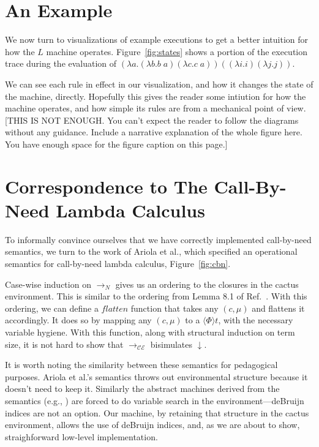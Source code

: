 \documentclass[preprint]{sigplanconf}
\begin{document}
\section{An Example}

We now turn to 
visualizations of example executions to get a better intuition for how the $L$
machine operates. Figure~\ref{fig:states} shows a portion
of the execution trace during the evaluation of $(\lambda a.(\lambda b.b \; a)
(\lambda c.c \; a)) ((\lambda i.i) (\lambda j.j))$. 



We can see each rule in effect in our visualization, and how it changes the
state of the machine, directly. Hopefully this gives the reader some intiution
for how the machine operates, and how simple its rules are from a mechanical
point of view. [THIS IS NOT ENOUGH. You can't expect the reader to follow the diagrams
without any guidance. Include a narrative explanation of the whole figure here. You have enough
space for the figure caption on this page.]

\section{Correspondence to The Call-By-Need Lambda Calculus}
To informally convince ourselves that we have correctly implemented call-by-need
semantics, we turn to the work of
Ariola et al.\cite{ariola1995call}, which specified an operational semantics for
call-by-need lambda calculus, Figure~\ref{fig:cbn}.



Case-wise induction on $\rightarrow_{N}$ gives us an ordering to the closures
in the cactus environment. This is similar to the ordering from Lemma 8.1 of
Ref.~\cite{ariola1995call}.
With this ordering, we can define a $flatten$ function that takes any $(c, \mu)$
and flattens it accordingly. It does so by mapping any $(c, \mu)$ to a $\langle
\Phi \rangle t$, with the necessary variable hygiene. With this function, along
with structural induction on term size, it is not hard to show that
$\rightarrow_{\mathcal{CE}}$ bisimulates $\downarrow$.

It is worth noting the similarity between these semantics for pedagogical
purposes. Ariola et al.'s semantics throws out environmental structure because
it doesn't need to keep it. Similarly the abstract machines derived from the
semantics (e.g., \cite{garcia2009lazy}) are forced to do variable search in the
environment---deBruijn indices are not an option. Our machine, by retaining that
structure in the cactus environment, allows the use of deBruijn indices, and,
as we are about to show, straighforward low-level
implementation.
\end{document}
